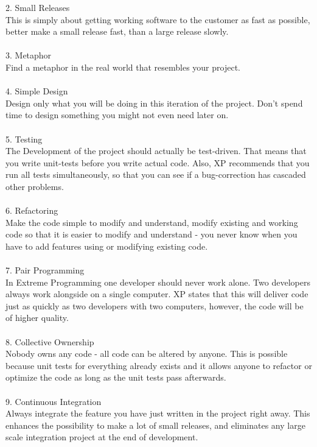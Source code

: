 2. Small Releases\\
This is simply about getting working software to the customer as fast as possible, better make a small release fast, than a large release slowly.\\
 \\
3. Metaphor\\
Find a metaphor in the real world that resembles your project.\\
 \\
4. Simple Design\\
Design only what you will be doing in this iteration of the project. Don't spend time to design something you might not even need later on.\\
 \\
5. Testing\\
The Development of the project should actually be test-driven. That means that you write unit-tests before you write actual code. Also, XP recommends that you run all tests simultaneously, so that you can see if a bug-correction has cascaded other problems.\\
 \\
6. Refactoring\\
Make the code simple to modify and understand, modify existing and working code so that it is easier to modify and understand - you never know when you have to add features using or modifying existing code.\\
 \\
7. Pair Programming\\
In Extreme Programming one developer should never work alone. Two developers always work alongside on a single computer. XP states that this will deliver code just as quickly as two developers with two computers, however, the code will be of higher quality.\\
 \\
8. Collective Ownership\\
Nobody owns any code - all code can be altered by anyone. This is possible because unit tests for everything already exists and it allows anyone to refactor or optimize the code as long as the unit tests pass afterwards.\\
 \\
9. Continuous Integration\\
Always integrate the feature you have just written in the project right away. This enhances the possibility to make a lot of small releases, and eliminates any large scale integration project at the end of development.\\
